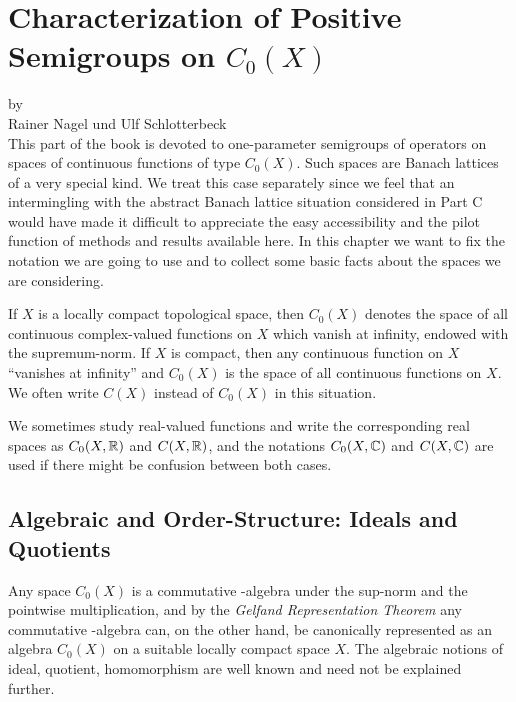 \chapter{Characterization of Positive Semigroups on  \texorpdfstring{$C_{0}(X)$}{C(X)}}
\label{chap:b1}
{\Large
\vspace*{-.75cm}
by \\[.25em]
Rainer Nagel und Ulf Schlotterbeck
\vspace{.75cm}
\\
}
This part of the book is devoted to one-parameter semigroups of operators on spaces of continuous functions of type $C_{0}(X)$.
Such spaces are Banach lattices of a very special kind.
We treat this case separately since we feel that an intermingling with the abstract Banach lattice situation considered in Part C would have made it difficult to appreciate the easy accessibility and the pilot function of methods and results available here.
In this chapter we want to fix the notation we are going to use and to collect some basic facts about the spaces we are considering.

If $X$ is a locally compact topological space, then $C_{0}(X)$ denotes the space of all continuous complex-valued functions on $X$ which vanish at infinity, endowed with the supremum-norm.
If $X$ is compact, then any continuous function on $X$ \enquote{vanishes at infinity} and $C_{0}(X)$ is the space of all continuous functions on $X$.
We often write $C(X)$ instead of $C_{0}(X)$ in this situation.

We sometimes study real-valued functions and write the corresponding real spaces as $C_{0}(X,\mathbb{R})$ and 
$C(X,\mathbb{R})$, and the notations $C_{0}(X,\mathbb{C})$ and $C(X,\mathbb{C})$ are used if there might be confusion between both cases.
\section{Algebraic and Order-Structure: Ideals and Quotients}\label{sec:b1-1}
Any space $C_{0}(X)$ is a commutative \CA-algebra under the sup-norm and the pointwise multiplication, and by the \emph{Gelfand Representation Theorem} any commutative \CA-algebra can, on the other hand, be canonically represented as an algebra $C_{0}(X)$ on a suitable locally compact space $X$.
The algebraic notions of ideal, quotient, homomorphism are well known and need not be explained further.

